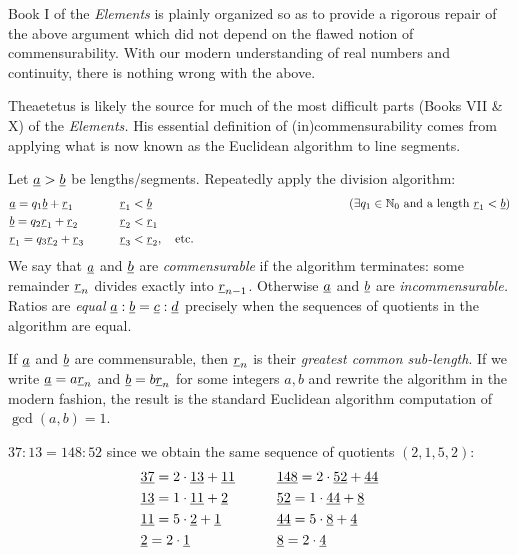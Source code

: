 Book I of the \emph{Elements} is plainly organized so as to provide a rigorous repair of the above argument which did not depend on the flawed notion of commensurability. With our modern understanding of real numbers and continuity, there is nothing wrong with the above.


\def\ul{\underline}

Theaetetus is likely the source for much of the most difficult parts (Books VII \& X) of the \emph{Elements.} His essential definition of (in)commensurability comes from applying what is now known as the Euclidean algorithm to line segments. 

\begin{defn*}{}{}
	Let $\ul a>\ul b$ be lengths/segments.\footnotemark{} Repeatedly apply the division algorithm: 
	\begin{align*}
		&\ul a =q_1\ul b+\ul r_1\qquad 
			&&\ul r_1<\ul b
			&&\hspace*{100pt}\tag{$\exists q_1\in\N_0$ and a length $\ul r_1<\ul b$}\\
		&\ul b=q_2\ul r_1+\ul r_2\qquad 
			&&\ul r_2<\ul r_1\\
		&\ul r_1=q_3\ul r_2+\ul r_3\qquad 
			&&\ul r_3<\ul r_2,\quad \text{etc.}
	\end{align*}
	We say that $\ul a$ and $\ul b$ are \emph{commensurable} if the algorithm terminates: some remainder $\ul r_n$ divides exactly into $\ul r_{n-1}$. Otherwise $\ul a$ and $\ul b$ are \emph{incommensurable.}\smallbreak
	Ratios are \emph{equal} $\ul a:\ul b=\ul c:\ul d$ precisely when the sequences of quotients in the algorithm are equal.
\end{defn*}


If $\ul a$ and $\ul b$ are commensurable, then $\ul r_n$ is their \emph{greatest common sub-length}. If we write $\ul a=a\ul r_n$ and $\ul b=b\ul r_n$ for some integers $a,b$ and rewrite the algorithm in the modern fashion, the result is the standard Euclidean algorithm computation of $\gcd(a,b)=1$.

$37:13=148:52$ since we obtain the same sequence of quotients $(2,1,5,2)$:
\begin{align*}
	&\ul{37}=2\cdot\ul{13}+\ul{11}\qquad 
		&&\ul{148}=2\cdot\ul{52}+\ul{44}\\
	&\ul{13}=1\cdot\ul{11}+\ul{2}\qquad 
		&&\ul{52}=1\cdot\ul{44}+\ul{8}\\
	&\ul{11}=5\cdot\ul{2}+\ul{1}\qquad 
		&&\ul{44}=5\cdot\ul{8}+\ul{4}\\
	&\ul{2}=2\cdot\ul{1}\qquad 
		&&\ul{8}=2\cdot\ul{4}
\end{align*}

